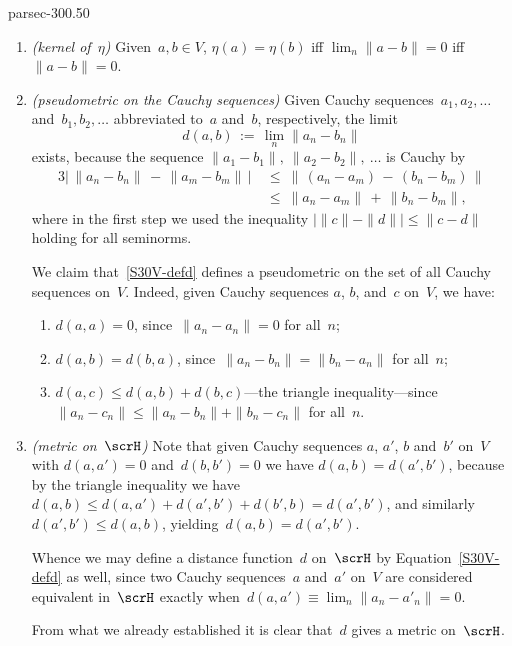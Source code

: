 \documentclass[b5page]{book}
\begin{document}
\begin{solution}{parsec-300.50}
\begin{enumerate}
\item
\emph{(kernel of~$\eta$)}
Given~$a,b\in V$,
 $\eta(a)=\eta(b)$
iff $\lim_n \|a-b\|=0$
iff $\|a-b\|=0$.
\item
\emph{(pseudometric on the Cauchy sequences)}
Given Cauchy sequences~$a_1,a_2,\dotsc$ and~$b_1,b_2,\dotsc$
abbreviated to~$a$ and~$b$, respectively,
the limit 
\begin{equation}
\label{S30V-defd}
\textstyle d(a,b)\,:=\,\lim_n \|a_n-b_n\|
\end{equation}
exists,
because the sequence  $\|a_1-b_1\|,\ \|a_2-b_2\|,\ \dotsc$
is Cauchy by
\begin{alignat*}{3}
\left|\,\|a_n-b_n\|\,-\,\|a_m-b_m\|\,\right|
\ &\leq\ 
\|\,(a_n-a_m)\,-\,(b_n-b_m)\,\|\\
\ &\leq\ \|a_n-a_m\|\,+\,\|b_n-b_m\|,
\end{alignat*}
where in the first step
we used the inequality  $\left|\|c\|-\|d\|\right|\leq \|c-d\|$
holding for all seminorms.

We claim that~\eqref{S30V-defd} defines
a pseudometric on the set of all Cauchy sequences on~$V$.
Indeed, given Cauchy sequences $a$, $b$, and~$c$ on~$V$,
we have:
\begin{enumerate}
\item
$d(a,a)=0$, since~$\|a_n-a_n\|=0$ for all~$n$;
\item
$d(a,b)=d(b,a)$, since~$\|a_n-b_n\|=\|b_n-a_n\|$
for all~$n$;
\item
$d(a,c)\leq d(a,b)+d(b,c)$---the triangle inequality---since
$\|a_n-c_n\|\leq \|a_n-b_n\|+\|b_n-c_n\|$
for all~$n$.
\end{enumerate}
\item\emph{(metric on~$\scrH$)}\label{S40Vmetric}
Note that given Cauchy sequences $a$, $a'$, $b$ and~$b'$ on~$V$
with $d(a,a')=0$ and~$d(b,b')=0$
we have $d(a,b)=d(a',b')$,
because by the triangle inequality
we have
$d(a,b) \leq d(a,a')+d(a',b')+d(b',b)
= d(a',b')$, and similarly $d(a',b')\leq d(a,b)$,
yielding~$d(a,b)=d(a',b')$.

Whence we may define a distance function~$d$ 
on~$\scrH$ by Equation~\eqref{S30V-defd} as well,
since two Cauchy sequences~$a$ and~$a'$
on~$V$ are considered equivalent in~$\scrH$
exactly when~$d(a,a')\equiv\lim_n\|a_n -a'_n\|=0$.

From what we already established it is clear that~$d$ gives a metric
on~$\scrH$.


\end{enumerate}
\end{solution}
\end{document}
